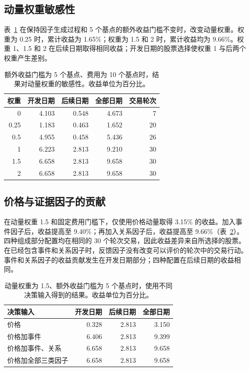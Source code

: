 \documentclass[conference]{IEEEtran}
\begin{document}
\subsection{动量权重敏感性}
表~\ref{tab:execution} 在保持因子生成过程和 5 个基点的额外收益门槛不变时，改变动量权重。权重为 0.25 时，累计收益为 1.65\%；权重为 1.5 和 2 时，累计收益均为 9.66\%。权重 1、1.5 和 2 在后续日期取得相同收益；开发日期的股票选择使权重 1 与后两个权重产生差别。

\begin{table}[!tb]
\centering
\caption{额外收益门槛为 5 个基点、费用为 10 个基点时，结果对动量权重的敏感性。收益单位为百分比。}
\label{tab:execution}
\begin{tabular}{rrrrr}
\toprule
权重 & 开发日期 & 后续日期 & 全部日期 & 交易轮次\\
\midrule
0 & 4.103 & 0.548 & 4.673 & 7\\
0.25 & 1.183 & 0.463 & 1.652 & 20\\
0.5 & 4.955 & 0.458 & 5.436 & 26\\
1 & 6.223 & 2.813 & 9.210 & 30\\
1.5 & 6.658 & 2.813 & 9.658 & 30\\
2 & 6.658 & 2.813 & 9.658 & 30\\
\bottomrule
\end{tabular}
\end{table}

\subsection{价格与证据因子的贡献}
在动量权重 1.5 和固定费用门槛下，仅使用价格动量取得 3.15\% 的收益。加入事件因子后，收益提高至 9.40\%；再加入关系因子后，收益提高至 9.66\%（表~\ref{tab:components}）。四种组成部分配置均在相同的 30 个轮次交易，因此收益差异来自所选择的股票。在已经包含事件和关系因子时，反馈因子没有改变可以评价的轮次中的交易行动。事件和关系因子的收益贡献发生在开发日期部分；四种配置在后续日期的收益相同。

\begin{table}[!tb]
\centering
\caption{动量权重为 1.5、额外收益门槛为 5 个基点时，使用不同决策输入得到的结果。收益单位为百分比。}
\label{tab:components}
\begin{tabular}{lrrr}
\toprule
决策输入 & 开发日期 & 后续日期 & 全部日期\\
\midrule
价格 & 0.328 & 2.813 & 3.150\\
价格加事件 & 6.406 & 2.813 & 9.399\\
价格加事件、关系 & 6.658 & 2.813 & 9.658\\
价格加全部三类因子 & 6.658 & 2.813 & 9.658\\
\bottomrule
\end{tabular}
\end{table}
\end{document}
